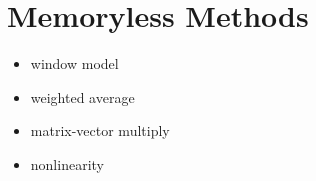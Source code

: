 \section{Memoryless Methods}
\label{sec:memoryless}

\begin{itemize}
  \item window model
  \item weighted average
  \item matrix-vector multiply
  \item nonlinearity
\end{itemize}
